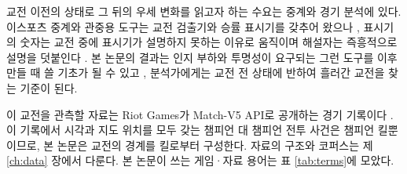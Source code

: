 교전 이전의 상태로 그 뒤의 우세 변화를 읽고자 하는 수요는 중계와 경기 분석에 있다. 이스포츠 중계와 관중용 도구는 교전 검출기와 승률 표시기를 갖추어 왔으나 \cite{block2018narrative,kokkinakis2020dax,pedrassoli2024passive}, 표시기의 숫자는 교전 중에 표시기가 설명하지 못하는 이유로 움직이며 해설자는 즉흥적으로 설명을 덧붙인다 \cite{pedrassoli2024wincondition}. 본 논문의 결과는 인지 부하와 투명성이 요구되는 그런 도구를 이후 만들 때 쓸 기초가 될 수 있고 \cite{charleer2018dashboards}, 분석가에게는 교전 전 상태에 반하여 흘러간 교전을 찾는 기준이 된다.

이 교전을 관측할 자료는 Riot Games가 Match-V5 API로 공개하는 경기 기록이다 \cite{riotapi2024matchv5,riotapi2024timeline}. 이 기록에서 시각과 지도 위치를 모두 갖는 챔피언 대 챔피언 전투 사건은 챔피언 킬뿐이므로, 본 논문은 교전의 경계를 킬로부터 구성한다. 자료의 구조와 코퍼스는 제 \ref{ch:data} 장에서 다룬다. 본 논문이 쓰는 게임·자료 용어는 표 \ref{tab:terms}에 모았다.


